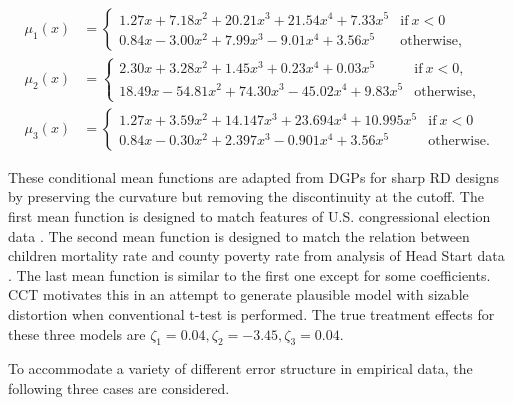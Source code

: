 \documentclass[12pt,]{article}
\newcommand{\textif}{\text{if}}
\newcommand{\otherwise}{\text{otherwise}}
\DeclareMathOperator{\1}{\mathbbm{1}}
\begin{document}
\begin{align*}
\mu_{1}(x) & =
\begin{cases}
1.27x + 7.18x^{2} + 20.21x^{3} + 21.54x^{4} + 7.33x^{5}
& \textif\ x < 0 \\
0.84x - 3.00x^{2} + 7.99x^3 - 9.01x^4 + 3.56x^{5}
& \otherwise,
\end{cases} \\
\mu_{2}(x) & =
\begin{cases}
2.30x + 3.28x^2 + 1.45x^3 + 0.23x^4 + 0.03x^5
& \textif\ x < 0, \\
18.49x - 54.81x^2 + 74.30x^3 - 45.02x^4 + 9.83x^5
& \otherwise,
\end{cases} \\
\mu_{3}(x) & =
\begin{cases}
1.27x + 3.59 x^{2} + 14.147 x^3 + 23.694 x^4 + 10.995 x^5
& \textif\ x < 0 \\
0.84x - 0.30 x^{2} + 2.397 x^3 - 0.901 x^4 + 3.56 x^5
& \otherwise.
\end{cases}
\end{align*}

These conditional mean functions are adapted from DGPs for sharp RD designs by preserving the curvature but removing the discontinuity at the cutoff. The first mean function is designed to match features of U.S. congressional election data \citep{lee2008randomized,imbens2011optimal}. The second mean function is designed to match the relation between children mortality rate and county poverty rate from analysis of Head Start data \citep{ludwig2005does}. The last mean function is similar to the first one except for some coefficients. CCT motivates this in an attempt to generate plausible model with sizable distortion when conventional t-test is performed. The true treatment effects for these three models are $\zeta_1 = 0.04, \zeta_2 = -3.45, \zeta_3 = 0.04$.

To accommodate a variety of different error structure in empirical data, the following three cases are considered.
\end{document}
